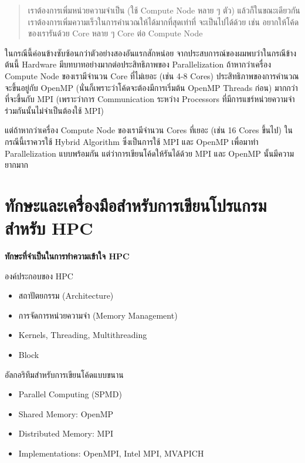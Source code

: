 \begin{quote}
  \color{gray}
  เราต้องการเพิ่มหน่วยความจำเป็น (ใช้ Compute Node หลาย ๆ ตัว) แล้วก็ในขณะเดียวกันเราต้องการเพิ่มความเร็วในการคำนวณให้ได้มากที่สุดเท่าที่%
  จะเป็นไปได้ด้วย เช่น อยากให้โค้ดของเรารันด้วย Core หลาย ๆ Core ต่อ Compute Node
\end{quote}

ในกรณีนี้ค่อนข้างซับซ้อนกว่าตัวอย่างสองอันแรกสักหน่อย จากประสบการณ์ของผมพบว่าในกรณีข้างต้นนี้ Hardware มีบทบาทอย่างมากต่อประสิทธิภาพของ
Parallelization ถ้าหากว่าเครื่อง Compute Node ของเรามีจำนวน Core ที่ไม่เยอะ (เช่น 4-8 Cores) ประสิทธิภาพของการคำนวณจะขึ้นอยู่กับ
OpenMP (นั่นก็เพราะว่าโค้ดจะต้องมีการเริ่มต้น OpenMP Threads ก่อน) มากกว่าที่จะขึ้นกับ MPI (เพราะว่าการ Communication ระหว่าง Processors
ที่มีการแชร์หน่วยความจำร่วมกันนั้นไม่จำเป็นต้องใช้ MPI)

แต่ถ้าหากว่าเครื่อง Compute Node ของเรามีจำนวน Cores ที่เยอะ (เช่น 16 Cores ขึ้นไป) ในกรณีนี้เราควรใช้ Hybrid Algorithm ซึ่งเป็นการใช้
MPI และ OpenMP เพื่อมาทำ Parallelization แบบพร้อมกัน แต่ว่าการเขียนโค้ดให้รันได้ด้วย MPI และ OpenMP นั้นมีความยากมาก

\section{ทักษะและเครื่องมือสำหรับการเขียนโปรแกรมสำหรับ HPC}

\noindent \textbf{ทักษะที่จำเป็นในการทำความเข้าใจ HPC}

\noindent องค์ประกอบของ HPC
%
\begin{itemize}[topsep=0pt,noitemsep]
  \setlength\itemsep{0.5em}
  \item สถาปัตยกรรม (Architecture)

  \item การจัดการหน่วยความจำ (Memory Management)

  \item Kernels, Threading, Multithreading

  \item Block
\end{itemize}

\noindent อัลกอริทึมสำหรับการเขียนโค้ดแบบขนาน
%
\begin{itemize}[topsep=0pt,noitemsep]
  \setlength\itemsep{0.5em}
  \item Parallel Computing (SPMD)

  \item Shared Memory: OpenMP

  \item Distributed Memory: MPI

  \item Implementations: OpenMPI, Intel MPI, MVAPICH
\end{itemize}

